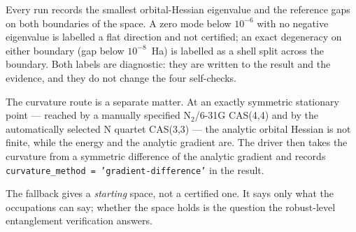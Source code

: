 Every run records the smallest orbital-Hessian eigenvalue and the
reference gaps on both boundaries of the space.  A zero mode below
$10^{-6}$ with no negative eigenvalue is labelled a flat direction and
not certified; an exact degeneracy on either boundary (gap below
$10^{-8}$~Ha) is labelled as a shell split across the boundary.  Both
labels are diagnostic: they are written to the result and the evidence,
and they do not change the four self-checks.

The curvature route is a separate matter.  At an exactly symmetric
stationary point --- reached by a manually specified N$_2$/6-31G
CAS(4,4) and by the automatically selected N quartet CAS(3,3) --- the
analytic orbital Hessian is not finite, while the energy and the
analytic gradient are.  The driver then takes the curvature from a
symmetric difference of the analytic gradient and records
\texttt{curvature\_method = 'gradient-difference'} in the result.

The fallback gives a \emph{starting} space, not a certified one.  It
says only what the occupations can say; whether the space holds is the
question the robust-level entanglement verification answers.
